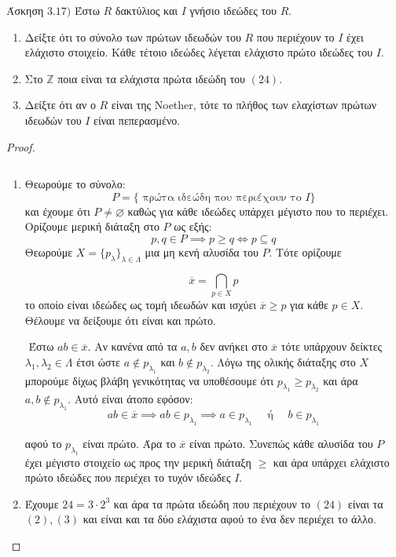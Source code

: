 \documentclass[oneside,a4paper]{article}
\newcommand {\tl}{\textlatin}
\newcommand{\Z}{\mathbb{Z}}
\begin{document}
\pagebreak


\noindent Άσκηση $3.17)$
\quad Έστω $R$ δακτύλιος και $I$ γνήσιο ιδεώδες του $R$.
\begin{enumerate}
	\item Δείξτε ότι το σύνολο των πρώτων ιδεωδών του $R$ που περιέχουν το $I$ έχει ελάχιστο στοιχείο. Κάθε τέτοιο ιδεώδες λέγεται ελάχιστο πρώτο ιδεώδες του $I$.
	\item Στο $\Z$ ποια είναι τα ελάχιστα πρώτα ιδεώδη του $(24)$.
	\item Δείξτε ότι αν ο $R$ είναι της \tl{Noether}, τότε το πλήθος των ελαχίστων πρώτων ιδεωδών του $I$ είναι πεπερασμένο.
\end{enumerate}

\begin{proof} $ $

	$ $\newline
	\begin{enumerate}
		\item Θεωρούμε το σύνολο:
		$$P = \{ \text{ πρώτα ιδεώδη που περιέχουν το } I\} $$
		και έχουμε ότι $P \neq \varnothing$ καθώς για κάθε ιδεώδες υπάρχει μέγιστο που το περιέχει. Ορίζουμε μερική διάταξη στο $P$ ως εξής:
		$$p,q \in P \implies p \geq q \iff p \subseteq q$$
		Θεωρούμε $X=\{p_{\lambda}\}_{\lambda \in \Lambda}$ μια μη κενή αλυσίδα του $P$. Τότε ορίζουμε

		$$\overline{x} = \bigcap\limits_{p\in X} p$$
		το οποίο είναι ιδεώδες ως τομή ιδεωδών και ισχύει $\overline{x} \geq p$ για κάθε $p \in X$. Θέλουμε να δείξουμε ότι είναι και πρώτο. 
		
		$ $\newline
		Έστω $ab \in \overline{x}$. Αν κανένα από τα $a,b$ δεν ανήκει στο $\overline{x}$ τότε υπάρχουν δείκτες $\lambda_1, \lambda_2 \in \Lambda$ έτσι ώστε $a \not\in p_{\lambda_1}$ και $b \not\in p_{\lambda_2}$. Λόγω της ολικής διάταξης στο $X$ μπορούμε δίχως βλάβη γενικότητας να υποθέσουμε ότι $p_{\lambda_1} \geq p_{\lambda_2}$ και άρα $a,b \not\in p_{\lambda_1}$. Αυτό είναι άτοπο εφόσον:
		$$ab \in \overline{x} \implies ab \in p_{\lambda_1} \implies a \in p_{\lambda_1} \quad\text{ ή } \quad b \in p_{\lambda_1}$$  

		αφού το $p_{\lambda_1}$ είναι πρώτο. Άρα το $\overline{x}$ είναι πρώτο. Συνεπώς κάθε αλυσίδα του $P$ έχει μέγιστο στοιχείο ως προς την μερική διάταξη $\geq$ και άρα υπάρχει ελάχιστο πρώτο ιδεώδες που περιέχει το τυχόν ιδεώδες $I$.

		\item Έχουμε $24 = 3\cdot 2^3$ και άρα τα πρώτα ιδεώδη που περιέχουν το $(24)$ είναι τα $(2),(3)$ και είναι και τα δύο ελάχιστα αφού το ένα δεν περιέχει το άλλο.
		

\end{enumerate}
\end{proof}
\end{document}
